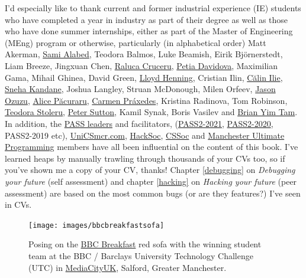 \documentclass[
]{book}
\begin{document}
I'd especially like to thank current and former industrial experience (IE) students who have completed a year in industry as part of their degree as well as those who have done summer internships, either as part of the Master of Engineering (MEng) program or otherwise, particularly (in alphabetical order) Matt Akerman, \href{https://github.com/samialabed}{Sami Alabed}, Teodora Balmos, Luke Beamish, Eirik Björnerstedt, Liam Breeze, Jingxuan Chen, \href{https://www.cdyf.me/raluca}{Raluca Cruceru}, \href{https://www.youtube.com/channel/UCDmn8CxaXGxZSKq83vhzULw}{Petia Davidova}, Maximilian Gama, Mihail Ghinea, David Green, \href{https://github.com/eldog}{Lloyd Henning}, Cristian Ilin, \href{https://github.com/calini}{Călin Ilie}, \href{https://www.cdyf.me/sneha}{Sneha Kandane}, Joshua Langley, Struan McDonough, Milen Orfeev, \href{https://www.cdyf.me/jason}{Jason Ozuzu}, \href{https://www.cdyf.me/alice}{Alice Păcuraru}, \href{https://www.cdyf.me/carmen}{Carmen Práxedes}, Kristina Radinova, Tom Robinson, \href{https://github.com/teostoleru}{Teodora Stoleru}, \href{https://github.com/dj-foxxy}{Peter Sutton}, Kamil Synak, Boris Vasilev and \href{https://www.cdyf.me/brian}{Brian Yim Tam}. In addition, the \href{http://www.pass.manchester.ac.uk}{PASS leaders} and facilitators, (\href{https://sites.google.com/view/compscipass2-2021}{PASS2-2021}, \href{https://sites.google.com/view/compsci-pass}{PASS2-2020}, PASS2-2019 etc), \href{https://unicsmcr.com/}{UniCSmcr.com}, \href{https://github.com/unicsmcr/hacksoc.com}{HackSoc}, \href{https://github.com/cssoc}{CSSoc} and \href{https://github.com/Man-UP}{Manchester Ultimate Programming} members have all been influential on the content of this book. I've learned heaps by manually trawling through thousands of your CVs too, so if you've shown me a copy of your CV, thanks! Chapter \ref{debugging} on \emph{Debugging your future} (self assessment) and chapter \ref{hacking} on \emph{Hacking your future} (peer assessment) are based on the most common bugs (or are they features?) I've seen in CVs.

\begin{figure}

{\centering \texttt{[image: images/bbcbreakfastsofa]} 

}

\caption{Posing on the \href{https://en.wikipedia.org/wiki/BBC_Breakfast}{BBC Breakfast} red sofa with the winning student team at the BBC / Barclays University Technology Challenge (UTC) in \href{https://en.wikipedia.org/wiki/MediaCityUK}{MediaCityUK}, Salford, Greater Manchester.}\label{fig:unnamed-chunk-3}
\end{figure}
\end{document}
